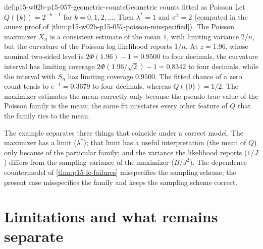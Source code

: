 \begin{hbexample}{def:p15-w02b-p15-057-geometric-counts}{Geometric counts fitted as Poisson}
Let \(Q(\{k\})=2^{-k-1}\) for \(k=0,1,2,\ldots\). Then \(\lambda^*=1\) and
\(\sigma^2=2\) (computed in the annex proof of
\cref{thm:p15-w02b-p15-057-poisson-misspecified}). The Poisson maximizer
\(\overline X_n\) is a consistent estimate of the mean \(1\), with
limiting variance \(2/n\), but the curvature of the Poisson log likelihood
reports \(1/n\). At \(z=1.96\), whose nominal two-sided level is
\(2\Phi(1.96)-1=0.9500\) to four decimals, the curvature interval has
limiting coverage \(2\Phi(1.96/\sqrt2)-1=0.8342\) to four decimals, while
the interval with \(S_n\) has limiting coverage \(0.9500\). The fitted
chance of a zero count tends to \(e^{-1}=0.3679\) to four decimals,
whereas \(Q(\{0\})=1/2\). The maximizer estimates the mean correctly only
because the pseudo-true value of the Poisson family is the mean; the same
fit misstates every other feature of \(Q\) that the family ties to the
mean.
\end{hbexample}

The example separates three things that coincide under a correct model.
The maximizer has a limit (\(\lambda^*\)); that limit has a useful
interpretation (the mean of \(Q\)) only because of the particular family;
and the variance the likelihood reports (\(1/J\)) differs from the
sampling variance of the maximizer (\(B/J^2\)). The dependence
countermodel of \cref{thm:p15-fe-failures} misspecifies the sampling
scheme; the present case misspecifies the family and keeps the sampling
scheme correct.

\section{Limitations and what remains separate}
\label{sec:p15-w02b-p15-057-limits}


